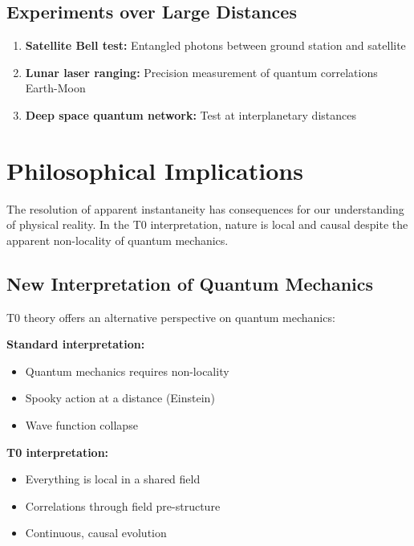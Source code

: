 	\subsection{Experiments over Large Distances}
	
	\begin{enumerate}
		\item \textbf{Satellite Bell test:} Entangled photons between ground station and satellite
		\item \textbf{Lunar laser ranging:} Precision measurement of quantum correlations Earth-Moon
		\item \textbf{Deep space quantum network:} Test at interplanetary distances
	\end{enumerate}
	
	\section{Philosophical Implications}
	
	The resolution of apparent instantaneity has consequences for our understanding of physical reality. In the T0 interpretation, nature is local and causal despite the apparent non-locality of quantum mechanics.
	
	\subsection{New Interpretation of Quantum Mechanics}
	
	T0 theory offers an alternative perspective on quantum mechanics:
	
	\begin{tcolorbox}[colback=t0red!5!white, colframe=t0red!75!black, title=New Perspective]
		\textbf{Standard interpretation:}
		\begin{itemize}
			\item Quantum mechanics requires non-locality
			\item Spooky action at a distance (Einstein)
			\item Wave function collapse
		\end{itemize}
		
		\textbf{T0 interpretation:}
		\begin{itemize}
			\item Everything is local in a shared field
			\item Correlations through field pre-structure
			\item Continuous, causal evolution
		\end{itemize}
	\end{tcolorbox}
	
